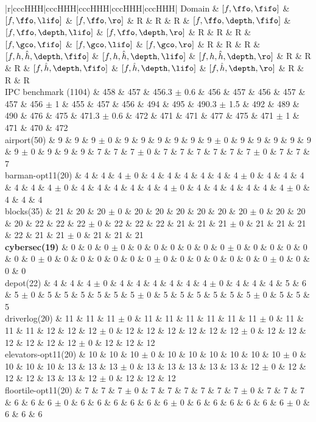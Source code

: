 \begin{center}
\begin{tabular}{|r|cccHHH|cccHHH|cccHHH|cccHHH|cccHHH|}
Domain & $[f,\ffo,\fifo]$ & $[f,\ffo,\lifo]$ & $[f,\ffo,\ro]$ & R & R & R & $[f,\ffo,\depth,\fifo]$ & $[f,\ffo,\depth,\lifo]$ & $[f,\ffo,\depth,\ro]$ & R & R & R & $[f,\gco,\fifo]$ & $[f,\gco,\lifo]$ & $[f,\gco,\ro]$ & R & R & R & $[f,h,\hat{h},\depth,\fifo]$ & $[f,h,\hat{h},\depth,\lifo]$ & $[f,h,\hat{h},\depth,\ro]$ & R & R & R & $[f,\hat{h},\depth,\fifo]$ & $[f,\hat{h},\depth,\lifo]$ & $[f,\hat{h},\depth,\ro]$ & R & R & R\\
\hline
IPC benchmark (1104) & 458 & 457 & 456.3 $\pm$ 0.6 & 456 & 457 & 456 & 457 & 457 & 456 $\pm$ 1 & 455 & 457 & 456 & 494 & 495 & 490.3 $\pm$ 1.5 & 492 & 489 & 490 & 476 & 475 & 471.3 $\pm$ 0.6 & 472 & 471 & 471 & 477 & 475 & 471 $\pm$ 1 & 471 & 470 & 472\\
\hline
airport(50) & 9 & 9 & 9 $\pm$ 0 & 9 & 9 & 9 & 9 & 9 & 9 $\pm$ 0 & 9 & 9 & 9 & 9 & 9 & 9 $\pm$ 0 & 9 & 9 & 9 & 7 & 7 & 7 $\pm$ 0 & 7 & 7 & 7 & 7 & 7 & 7 $\pm$ 0 & 7 & 7 & 7\\
barman-opt11(20) & 4 & 4 & 4 $\pm$ 0 & 4 & 4 & 4 & 4 & 4 & 4 $\pm$ 0 & 4 & 4 & 4 & 4 & 4 & 4 $\pm$ 0 & 4 & 4 & 4 & 4 & 4 & 4 $\pm$ 0 & 4 & 4 & 4 & 4 & 4 & 4 $\pm$ 0 & 4 & 4 & 4\\
blocks(35) & 21 & 20 & 20 $\pm$ 0 & 20 & 20 & 20 & 20 & 20 & 20 $\pm$ 0 & 20 & 20 & 20 & 22 & 22 & 22 $\pm$ 0 & 22 & 22 & 22 & 21 & 21 & 21 $\pm$ 0 & 21 & 21 & 21 & 22 & 21 & 21 $\pm$ 0 & 21 & 21 & 21\\
\textbf{cybersec(19)} & 0 & 0 & 0 $\pm$ 0 & 0 & 0 & 0 & 0 & 0 & 0 $\pm$ 0 & 0 & 0 & 0 & 0 & 0 & 0 $\pm$ 0 & 0 & 0 & 0 & 0 & 0 & 0 $\pm$ 0 & 0 & 0 & 0 & 0 & 0 & 0 $\pm$ 0 & 0 & 0 & 0\\
depot(22) & 4 & 4 & 4 $\pm$ 0 & 4 & 4 & 4 & 4 & 4 & 4 $\pm$ 0 & 4 & 4 & 4 & 5 & 6 & 5 $\pm$ 0 & 5 & 5 & 5 & 5 & 5 & 5 $\pm$ 0 & 5 & 5 & 5 & 5 & 5 & 5 $\pm$ 0 & 5 & 5 & 5\\
driverlog(20) & 11 & 11 & 11 $\pm$ 0 & 11 & 11 & 11 & 11 & 11 & 11 $\pm$ 0 & 11 & 11 & 11 & 12 & 12 & 12 $\pm$ 0 & 12 & 12 & 12 & 12 & 12 & 12 $\pm$ 0 & 12 & 12 & 12 & 12 & 12 & 12 $\pm$ 0 & 12 & 12 & 12\\
elevators-opt11(20) & 10 & 10 & 10 $\pm$ 0 & 10 & 10 & 10 & 10 & 10 & 10 $\pm$ 0 & 10 & 10 & 10 & 13 & 13 & 13 $\pm$ 0 & 13 & 13 & 13 & 13 & 13 & 12 $\pm$ 0 & 12 & 12 & 12 & 13 & 13 & 12 $\pm$ 0 & 12 & 12 & 12\\
floortile-opt11(20) & 7 & 7 & 7 $\pm$ 0 & 7 & 7 & 7 & 7 & 7 & 7 $\pm$ 0 & 7 & 7 & 7 & 6 & 6 & 6 $\pm$ 0 & 6 & 6 & 6 & 6 & 6 & 6 $\pm$ 0 & 6 & 6 & 6 & 6 & 6 & 6 $\pm$ 0 & 6 & 6 & 6\\

\end{tabular}
\end{center}
